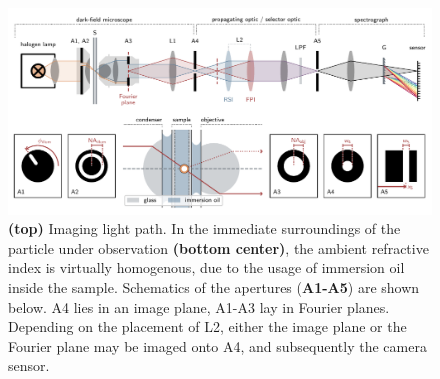 \documentclass[10pt]{article}
\begin{document}
\begin{multicols}{2}
\begin{figure}[t!]
    \centering
    \includegraphics[width=\textwidth]{[fig] setup}
    \caption{
    {\sffamily\bfseries (top)} Imaging light path. %
    In the immediate surroundings of the particle under observation {\sffamily\bfseries (bottom center)}, the ambient refractive index is virtually homogenous, due to the usage of immersion oil inside the sample.  
    Schematics of the apertures ({\sffamily\bfseries A1-A5}) are shown below. 
    {\sffamily A4} lies in an image plane, {\sffamily A1-A3} lay in Fourier planes. Depending on the placement of {\sffamily L2}, either the image plane or the Fourier plane may be imaged onto {\sffamily A4}, and subsequently the camera sensor. 
    }
    \label{fig:setup}
\end{figure}


\end{multicols}
\end{document}
